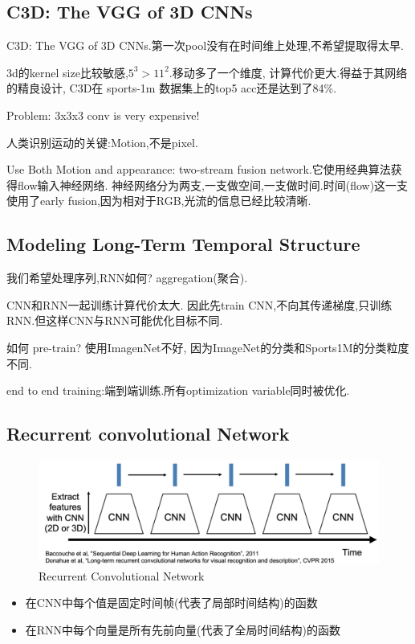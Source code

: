 \subsection{C3D: The VGG of 3D CNNs}

C3D: The VGG of 3D CNNs.第一次pool没有在时间维上处理,不希望提取得太早.

3d的kernel size比较敏感,$5^3 > 11^2$.移动多了一个维度,
计算代价更大.得益于其网络的精良设计,
C3D在 sports-1m 数据集上的top5 acc还是达到了84\%.

Problem: 3x3x3 conv is very expensive!

人类识别运动的关键:Motion,不是pixel.

Use Both Motion and appearance: two-stream fusion network.它使用经典算法获得flow输入神经网络.
神经网络分为两支,一支做空间,一支做时间.时间(flow)这一支使用了early fusion,因为相对于RGB,光流的信息已经比较清晰.

\subsection{Modeling Long-Term Temporal Structure}

我们希望处理序列,RNN如何? aggregation(聚合).

CNN和RNN一起训练计算代价太大.
因此先train CNN,不向其传递梯度,只训练RNN.但这样CNN与RNN可能优化目标不同.

如何 pre-train? 使用ImagenNet不好, 因为ImageNet的分类和Sports1M的分类粒度不同.

end to end training:端到端训练.所有optimization variable同时被优化.

\subsection{Recurrent convolutional Network}

\begin{figure}[htbp]
    \centering
    \includegraphics[scale=0.2]{figures/recur_CNN.png}
    \caption{Recurrent Convolutional Network}
\end{figure}

\begin{itemize}
    \item 在CNN中每个值是固定时间帧(代表了局部时间结构)的函数 
    \item 在RNN中每个向量是所有先前向量(代表了全局时间结构)的函数
\end{itemize}

